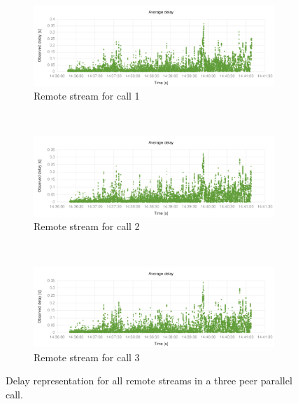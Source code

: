 \begin{figure}[h]
        \centering
        \begin{subfigure}[b]{0.5\textwidth}
                \centering
                \includegraphics[width=\textwidth]{./figures/delay_three_parallel_1.pdf}
                \caption{Remote stream for call 1}
                \label{fig:three_parallel_1}
        \end{subfigure}%
        ~ %
        \begin{subfigure}[b]{0.5\textwidth}
                \centering
                \includegraphics[width=\textwidth]{./figures/delay_three_parallel_2.pdf}
                \caption{Remote stream for call 2}
                \label{fig:three_parallel_2}
        \end{subfigure}        
        ~ %
        \begin{subfigure}[b]{0.5\textwidth}
                \centering
                \includegraphics[width=\textwidth]{./figures/delay_three_parallel_3.pdf}
                \caption{Remote stream for call 3}
                \label{fig:three_parallel_3}
        \end{subfigure}
        \caption[Delay representation for all remote streams in a three peer parallel call]{Delay representation for all remote streams in a three peer parallel call.}
        \label{fig:delay_three_parallel}
\end{figure}

